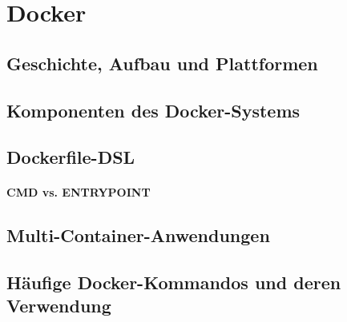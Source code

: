 \chapter{Docker}
\label{cha:docker}
\section{Geschichte, Aufbau und Plattformen}
\label{sec:docker-basics}
\section{Komponenten des Docker-Systems}
\label{sec:docker-komponenten}
\section{Dockerfile-DSL}
\label{sec:dockerfiles}
\subsubsection{CMD vs. ENTRYPOINT}

\section{Multi-Container-Anwendungen}
\label{sec:docker-multi-container-anwendungen}
\section{Häufige Docker-Kommandos und deren Verwendung}
\label{docker-verwendung}
